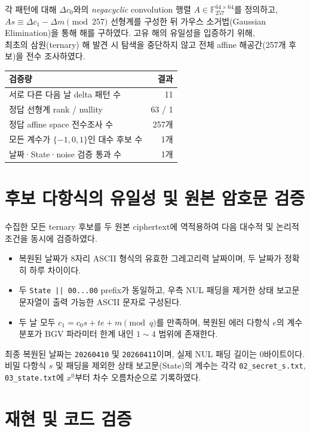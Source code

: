 \documentclass[10pt,a4paper]{article}
\begin{document}
각 패턴에 대해 $\Delta c_0$와의 \emph{negacyclic} convolution 행렬 $A\in\mathbb F_{257}^{64\times64}$를 정의하고, $As\equiv\Delta c_1-\Delta m\pmod{257}$ 선형계를 구성한 뒤 가우스 소거법(Gaussian Elimination)을 통해 해를 구하였다. 고유 해의 유일성을 입증하기 위해, \\
최초의 삼원(ternary) 해 발견 시 탐색을 중단하지 않고 전체 affine 해공간(257개 후보)을 전수 조사하였다.

\begin{center}
\begin{tabular}{lr}
\toprule
검증량 & 결과 \\
\midrule
서로 다른 다음 날 delta 패턴 수 & 11 \\
정답 선형계 rank / nullity & 63 / 1 \\
정답 affine space 전수조사 수 & 257개 \\
모든 계수가 $\{-1,0,1\}$인 대수 후보 수 & 1개 \\
날짜·State·noise 검증 통과 수 & 1개 \\
\bottomrule
\end{tabular}
\end{center}

\section{후보 다항식의 유일성 및 원본 암호문 검증}

수집한 모든 ternary 후보를 두 원본 ciphertext에 역적용하여 다음 대수적 및 논리적 조건을 동시에 검증하였다.

\begin{itemize}
  \item 복원된 날짜가 8자리 ASCII 형식의 유효한 그레고리력 날짜이며, 두 날짜가 정확히 하루 차이이다.
  \item 두 \texttt{State || 00...00} prefix가 동일하고, 우측 NUL 패딩을 제거한 상태 보고문 문자열이 출력 가능한 ASCII 문자로 구성된다.
  \item 두 날 모두 $c_1=c_0s+te+m\pmod q$를 만족하며, 복원된 에러 다항식 $e$의 계수 분포가 BGV 파라미터 한계 내인 $1 \sim 4$ 범위에 존재한다.
\end{itemize}

최종 복원된 날짜는 \texttt{20260410} 및 \texttt{20260411}이며, 실제 NUL 패딩 길이는 0바이트이다. 비밀 다항식 $s$ 및 패딩을 제외한 상태 보고문(State)의 계수는 각각 \texttt{02\_secret\_s.txt}, \texttt{03\_state.txt}에 $x^0$부터 차수 오름차순으로 기록하였다.

\section{재현 및 코드 검증}
\end{document}
